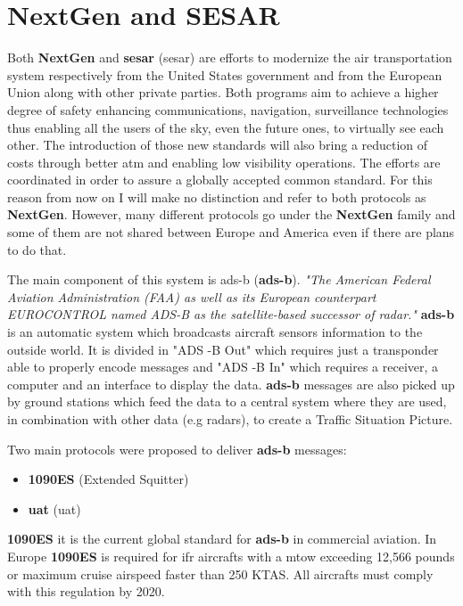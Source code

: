 \documentclass[../main.tex]{subfiles}
\begin{document}
\section{NextGen and SESAR}

Both \textbf{NextGen} and \textbf{\acrshort{sesar}} (\acrlong{sesar}) are efforts to modernize the air transportation system respectively from the United States government and from the European Union along with other private parties. Both programs aim to achieve a higher degree of safety enhancing communications, navigation, surveillance technologies thus enabling all the users of the sky, even the future ones, to virtually see each other. The introduction of those new standards will also bring a reduction of costs through better \acrshort{atm} and enabling low visibility operations. The efforts are coordinated in order to assure a globally accepted common standard. For this reason from now on I will make no distinction and refer to both protocols as \textbf{NextGen}. However, many different protocols go under the \textbf{NextGen} family and some of them are not shared between Europe and America even if there are plans to do that.

The main component of this system is \acrlong{ads-b} (\textbf{\acrshort{ads-b}}).
\textit{"The American Federal Aviation Administration (FAA) as well as its European counterpart EUROCONTROL named ADS-B as the satellite-based successor of radar."}\cite{stroh14}
\textbf{\acrshort{ads-b}} is an automatic system which broadcasts aircraft sensors information to the outside world. It is divided in "ADS -B Out" which requires just a transponder able to properly encode messages and "ADS -B In" which requires a receiver, a computer and an interface to display the data.
\textbf{\acrshort{ads-b}} messages are also picked up by ground stations which feed the data to a central system where they are used, in combination with other data (e.g radars), to create a Traffic Situation Picture.

Two main protocols were proposed to deliver \textbf{\acrshort{ads-b}} messages:
\begin{itemize}
  \item \textbf{1090ES} (Extended Squitter)
  \item \textbf{\acrshort{uat}} (\acrlong{uat})
\end{itemize}

\textbf{1090ES} it is the current global standard for \textbf{\acrshort{ads-b}} in commercial aviation. In Europe \textbf{1090ES} is required for \acrshort{ifr} aircrafts with a \acrshort{mtow} exceeding 12,566 pounds or maximum cruise airspeed faster than 250 KTAS. All aircrafts must comply with this regulation by 2020. \cite{eu1090}
\end{document}
